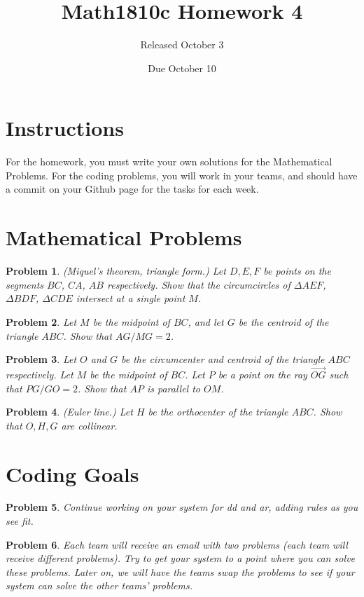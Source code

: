 \documentclass{article}
\title{Math1810c Homework 4}
\author{Released October 3}
\date{Due October 10}
\newtheorem{problem}{Problem}
\begin{document}
\maketitle

\section{Instructions}

For the homework, you must write your own solutions for the Mathematical Problems. For the coding problems, you will work in your teams, and should have a commit on your Github page for the tasks for each week. 

\section{Mathematical Problems}

\begin{problem}
(Miquel's theorem, triangle form.) Let $D,E,F$ be points on the segments
$BC$, $CA$, $AB$ respectively. Show that the circumcircles of $\Delta AEF$,
$\Delta BDF$, $\Delta CDE$ intersect at a single point $M$.
\end{problem}

\begin{problem}
Let $M$ be the midpoint of $BC$, and let $G$ be the centroid of the triangle $ABC$. Show that $AG/MG=2$.  
\end{problem}

\begin{problem}
Let $O$ and $G$ be the circumcenter and centroid of the triangle $ABC$ respectively. Let $M$ be the midpoint of $BC$. Let $P$ be a point on the ray $\vec{OG}$ such that $PG/GO =2$. Show that $AP$ is parallel to $OM$.
\end{problem}

\begin{problem}
    (Euler line.) Let $H$ be the orthocenter of the triangle $ABC$. Show that
    $O,H,G$ are collinear.
\end{problem}



\newpage

\section{Coding Goals}

\begin{problem}
    Continue working on your system for dd and ar, adding rules as you see fit.
\end{problem}

\begin{problem}
    Each team will receive an email with two problems (each team will receive different problems). Try to get your system to a point where you can solve these problems. Later on, we will have the teams swap the problems to see if your system can solve the other teams' problems. 
\end{problem}
\end{document}
